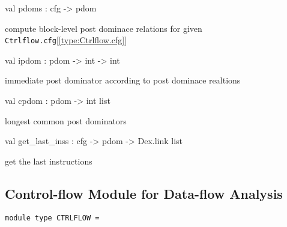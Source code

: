 \documentclass[11pt]{article}
\begin{document}
\label{val:Ctrlflow.pdoms}\begin{ocamldoccode}
val pdoms : cfg -> pdom
\end{ocamldoccode}
\begin{ocamldocdescription}
compute block-level post dominace relations for given {\tt{Ctrlflow.cfg}}[\ref{type:Ctrlflow.cfg}]


\end{ocamldocdescription}




\label{val:Ctrlflow.ipdom}\begin{ocamldoccode}
val ipdom : pdom -> int -> int
\end{ocamldoccode}
\begin{ocamldocdescription}
immediate post dominator according to post dominace realtions


\end{ocamldocdescription}




\label{val:Ctrlflow.cpdom}\begin{ocamldoccode}
val cpdom : pdom -> int list
\end{ocamldoccode}
\begin{ocamldocdescription}
longest common post dominators


\end{ocamldocdescription}




\label{val:Ctrlflow.get-underscorelast-underscoreinss}\begin{ocamldoccode}
val get_last_inss : cfg -> pdom -> Dex.link list
\end{ocamldoccode}
\begin{ocamldocdescription}
get the last instructions


\end{ocamldocdescription}




\subsection{Control-flow Module for Data-flow Analysis}




\begin{ocamldoccode}
{\tt{module type }}{\tt{CTRLFLOW}}{\tt{ = }}\end{ocamldoccode}
\label{moduletype:Ctrlflow.CTRLFLOW}
\end{document}
